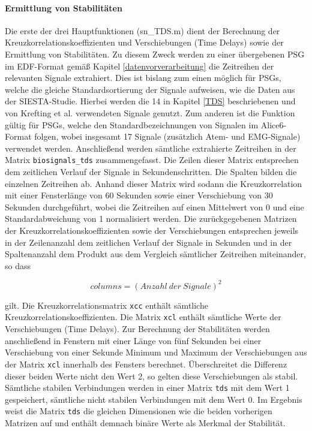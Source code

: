 \paragraph{Ermittlung von Stabilitäten} Die erste der drei Hauptfunktionen (sn\_TDS.m) dient der Berechnung der Kreuzkorrelationskoeffizienten und Verschiebungen (Time Delays) sowie der Ermittlung von Stabilitäten. Zu diesem Zweck werden zu einer übergebenen \acs{PSG} im \acs{EDF}-Format gemäß Kapitel \ref{datenvorverarbeitung} die Zeitreihen der relevanten Signale extrahiert. Dies ist bislang zum einen möglich für \acs{PSG}s, welche die gleiche Standardsortierung der Signale aufweisen, wie die Daten aus der SIESTA-Studie. Hierbei werden die 14 in Kapitel \ref{TDS} beschriebenen und von Krefting et al. verwendeten Signale genutzt. Zum anderen ist die Funktion gültig für \acs{PSG}s, welche den Standardbezeichnungen von Signalen im Alice6-Format folgen, wobei insgesamt 17 Signale (zusätzlich Atem- und \acs{EMG}-Signale) verwendet werden. Anschließend werden sämtliche extrahierte Zeitreihen in der Matrix \texttt{biosignals\_tds} zusammengefasst. Die Zeilen dieser Matrix entsprechen dem zeitlichen Verlauf der Signale in Sekundenschritten. Die Spalten bilden die einzelnen Zeitreihen ab. Anhand dieser Matrix wird sodann die Kreuzkorrelation mit einer Fensterlänge von 60 Sekunden sowie einer Verschiebung von 30 Sekunden durchgeführt, wobei die Zeitreihen auf einen Mittelwert von 0 und eine Standardabweichung von 1 normalisiert werden. Die zurückgegebenen Matrizen der Kreuzkorrelationskoeffizienten sowie der Verschiebungen entsprechen jeweils in der Zeilenanzahl dem zeitlichen Verlauf der Signale in Sekunden und in der Spaltenanzahl dem Produkt aus dem Vergleich sämtlicher Zeitreihen miteinander, so dass 

\begin{equation}
columns = (Anzahl~der~Signale)^2
	\label{eq:columns}
\end{equation}

gilt. Die Kreuzkorrelationsmatrix \texttt{xcc} enthält sämtliche Kreuzkorrelationskoeffizienten. Die Matrix \texttt{xcl} enthält sämtliche Werte der Verschiebungen (Time Delays). Zur Berechnung der Stabilitäten werden anschließend in Fenstern mit einer Länge von fünf Sekunden bei einer Verschiebung von einer Sekunde Minimum und Maximum der Verschiebungen aus der Matrix \texttt{xcl} innerhalb des Fensters berechnet. Überschreitet die Differenz dieser beiden Werte nicht den Wert 2, so gelten diese Verschiebungen als stabil. Sämtliche stabilen Verbindungen werden in einer Matrix \texttt{tds} mit dem Wert 1 gespeichert, sämtliche nicht stabilen Verbindungen mit dem Wert 0. Im Ergebnis weist die Matrix \texttt{tds} die gleichen Dimensionen wie die beiden vorherigen Matrizen auf und enthält demnach binäre Werte als Merkmal der Stabilität.

